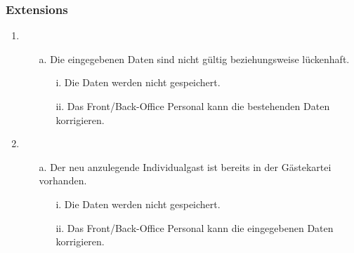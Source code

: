\documentclass[./detailed_overview_usecases.tex]{subfiles}
\begin{document}
    \subsubsection*{Extensions}
    \begin{enumerate}
        \item
        \begin{itemize}
            \item[a.] Die eingegebenen Daten sind nicht gültig beziehungsweise lückenhaft.
                \begin{itemize}
                       \item[i.] Die Daten werden nicht gespeichert.
                       \item[ii.] Das Front/Back-Office Personal kann die bestehenden Daten korrigieren.
                \end{itemize}
        \end{itemize}
        \item
        \begin{itemize}
            \item[a.] Der neu anzulegende Individualgast ist bereits in der Gästekartei vorhanden.
                \begin{itemize}
                        \item[i.] Die Daten werden nicht gespeichert.
                        \item[ii.] Das Front/Back-Office Personal kann die eingegebenen Daten korrigieren.
                \end{itemize}
        \end{itemize}
    \end{enumerate}
\end{document}

